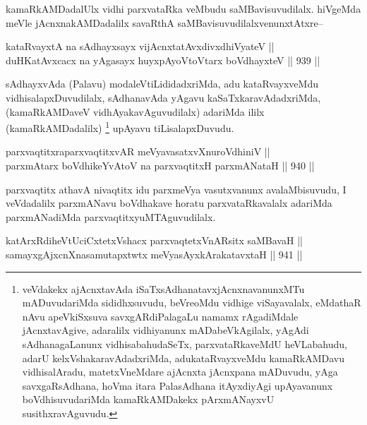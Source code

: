 \begin{artha}
kamaRkAMDadalUlx vidhi parxvataRka veMbudu saMBavisuvudilalx. hiVgeMda meVle jAcnxnakAMDadalilx savaRthA saMBavisuvudilalxvenunxtAtxre{\rm --}
\end{artha}

\begin{shl}
kataRvayxtA na sAdhayxsayx vijAcnxtatAvxdivxdhiVyateV || \\
duHKatAvxcacx na yAgasayx huyxpAyoV\s toV\s tarx boVdhayxteV \hfill || 939 ||  
\end{shl}

\begin{artha}
sAdhayxvAda (Palavu) modaleVtiLididadxriMda, adu kataRvayxveMdu vidhisalapxDuvudilalx, sAdhanavAda yAgavu kaSaTxkaravAdadxriMda,(kamaRkAMDaveV vidhAyakavAguvudilalx) adariMda ililx (kamaRkAMDadalilx) \footnote{veVdakekx ajAcnxtavAda iSaTxsAdhanatavxjAcnxnavanunxMTu mADuvudariMda sididhxsuvudu, beVreoMdu vidhige viSayavalalx, eMdathaR nAvu apeVkiSxsuva savxgARdiPalagaLu namamx rAgadiMdale jAcnxtavAgive, adaralilx vidhiyanunx mADabeVkAgilalx, yAgAdi sAdhanagaLanunx vidhisabahudaSeTx, parxvataRkaveMdU heVLabahudu, adarU kelxVshakaravAdadxriMda, adukataRvayxveMdu kamaRkAMDavu vidhisalAradu, matetxVneMdare ajAcnxta jAcnxpana mADuvudu, yAga savxgaRsAdhana, hoVma itara PalasAdhana itAyxdiyAgi upAyavanunx boVdhisuvudariMda kamaRkAMDakekx pArxmANayxvU susithxravAguvudu.} upAyavu tiLisalapxDuvudu.
\end{artha}


\begin{shl}
parxvaqtitxraparxvaqtitxvAR meVyavasatxvXnuroVdhiniV || \\
parxmA\s tarx boVdhikeYvAtoV na parxvaqtitxH parxmANataH \hfill || 940 ||  
\end{shl}

\begin{artha}
parxvaqtitx athavA nivaqtitx idu parxmeVya vasutxvanunx avalaMbisuvudu, I veVdadalilx parxmANavu boVdhakave horatu parxvataRkavalalx adariMda parxmANadiMda parxvaqtitxyuMTAguvudilalx.
\end{artha}

\begin{shl}
katArxRdiheVtUciCxtetxVshacx parxvaqtetxVnARsitx saMBavaH || \\
samayxgAjxcnXnasamutapxtwtx meVyasAyxkArakatavxtaH \hfill || 941 ||  
\end{shl}

